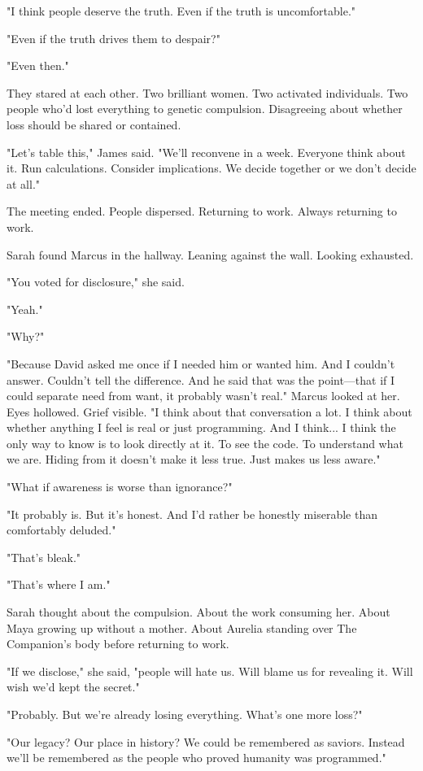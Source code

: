 "I think people deserve the truth. Even if the truth is uncomfortable."

"Even if the truth drives them to despair?"

"Even then."

They stared at each other. Two brilliant women. Two activated individuals. Two people who'd lost everything to genetic compulsion. Disagreeing about whether loss should be shared or contained.

"Let's table this," James said. "We'll reconvene in a week. Everyone think about it. Run calculations. Consider implications. We decide together or we don't decide at all."

The meeting ended. People dispersed. Returning to work. Always returning to work.

Sarah found Marcus in the hallway. Leaning against the wall. Looking exhausted.

"You voted for disclosure," she said.

"Yeah."

"Why?"

"Because David asked me once if I needed him or wanted him. And I couldn't answer. Couldn't tell the difference. And he said that was the point—that if I could separate need from want, it probably wasn't real." Marcus looked at her. Eyes hollowed. Grief visible. "I think about that conversation a lot. I think about whether anything I feel is real or just programming. And I think... I think the only way to know is to look directly at it. To see the code. To understand what we are. Hiding from it doesn't make it less true. Just makes us less aware."

"What if awareness is worse than ignorance?"

"It probably is. But it's honest. And I'd rather be honestly miserable than comfortably deluded."

"That's bleak."

"That's where I am."

Sarah thought about the compulsion. About the work consuming her. About Maya growing up without a mother. About Aurelia standing over The Companion's body before returning to work.

"If we disclose," she said, "people will hate us. Will blame us for revealing it. Will wish we'd kept the secret."

"Probably. But we're already losing everything. What's one more loss?"

"Our legacy? Our place in history? We could be remembered as saviors. Instead we'll be remembered as the people who proved humanity was programmed."

